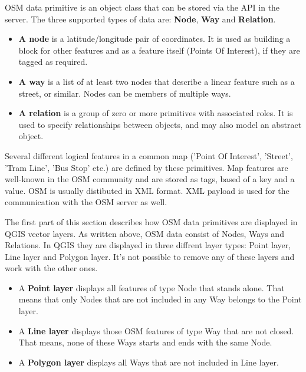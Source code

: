 OSM data primitive is an object class that can be stored via the API in the
server. The three supported types of data are: \textbf{Node}, \textbf{Way} 
and \textbf{Relation}. 

\begin{itemize}[label=--]
\item \textbf{A node} is a latitude/longitude pair of coordinates. It is 
used as building a block for other features and as a feature itself (Points 
Of Interest), if they are tagged as required. 
\item \textbf{A way} is a list of at least two nodes that describe a linear
feature such as a street, or similar. Nodes can be members of multiple ways.
\item \textbf{A relation} is a group of zero or more primitives with 
associated roles. It is used to specify relationships between objects, 
and may also model an abstract object. 
\end{itemize}

Several different logical features in a common map ('Point Of Interest',
'Street', 'Tram Line', 'Bus Stop' etc.) are defined by these primitives. 
Map features are well-known in the OSM community and are stored as tags, 
based of a key and a value. OSM is usually distibuted in XML format. XML 
payload is used for the communication with the OSM server as well.

\label{qgis-osm-connection}

The first part of this section describes how OSM data primitives 
are displayed in QGIS vector layers. As written above, OSM data consist of 
Nodes, Ways and Relations. In QGIS they are displayed in three diffrent 
layer types: Point layer, Line layer and Polygon layer. It's not possible 
to remove any of these layers and work with the other ones.

\begin{itemize}[label=--]
\item A \textbf{Point layer} displays all features of type Node that stands 
alone. That means that only Nodes that are not included in any Way belongs 
to the Point layer.
\item A \textbf{Line layer} displays those OSM features of type Way that are 
not closed. That means, none of these Ways starts and ends with the 
same Node.
\item A \textbf{Polygon layer} displays all Ways that are not included in 
Line layer.
\end{itemize}

